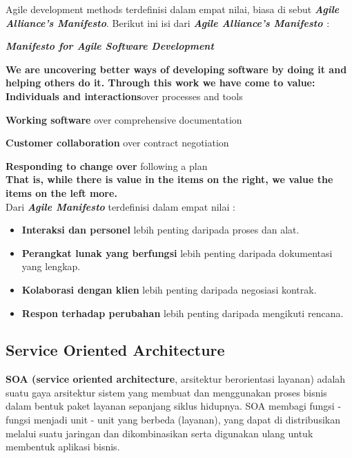 \documentclass[9pt,twocolumn,twoside]{Gunadarma}
\begin{document}
Agile development methods terdefinisi dalam empat nilai, biasa di sebut \textbf{\textit{Agile Alliance’s Manifesto}}. Berikut ini isi dari \textbf{\textit{Agile Alliance’s Manifesto \cite{Agile:01}}} : 

\begin{center}
{\Large \textbf{\textit{Manifesto for Agile Software Development}}}
\end{center}

\textbf{We are uncovering better ways of developing
software by doing it and helping others do it.
Through this work we have come to value:}
\\

\textbf{\Large{Individuals and interactions}}over processes and tools

\textbf{\Large{Working software}} over comprehensive documentation

\textbf{\Large{Customer collaboration}} over contract negotiation

\textbf{\Large{Responding to change over}} following a plan
\\

\textbf{That is, while there is value in the items on
the right, we value the items on the left more.}
\\

Dari \textbf{\textit{Agile Manifesto}} terdefinisi dalam empat nilai :
\begin{itemize}
\item \textbf{Interaksi dan personel} lebih penting daripada proses dan alat.
\item \textbf{Perangkat lunak yang berfungsi} lebih penting daripada dokumentasi yang lengkap.
\item \textbf{Kolaborasi dengan klien} lebih penting daripada negosiasi kontrak.
\item \textbf{Respon terhadap perubahan} lebih penting daripada mengikuti rencana.
\end{itemize}

\subsection{Service Oriented Architecture}

\textbf{SOA (service oriented architecture}, arsitektur berorientasi layanan) adalah suatu gaya arsitektur sistem yang membuat dan menggunakan proses bisnis dalam bentuk paket layanan sepanjang siklus hidupnya. SOA membagi fungsi - fungsi menjadi unit - unit yang berbeda (layanan), yang dapat di distribusikan melalui suatu jaringan dan dikombinasikan serta digunakan ulang untuk membentuk aplikasi bisnis.
\end{document}
